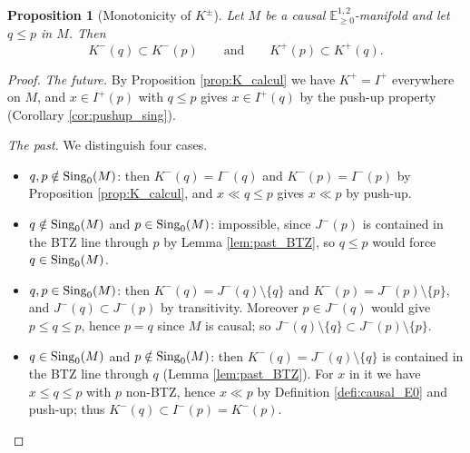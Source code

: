 \documentclass[a4paper,twoside]{article}
\newcommand{\mass}[1]{\mathbb{E}^{1,2}_{#1}}
\newtheorem{prop}[lem]{Proposition}
\begin{document}
\begin{prop}[Monotonicity of $K^\pm$]\label{prop:K_monotone}
Let $M$ be a causal $\mass{\geq0}$-manifold and let $q\leq p$ in $M$. Then
$$K^-(q)\subset K^-(p) \qquad\text{and}\qquad K^+(p)\subset K^+(q).$$
\end{prop}
\begin{proof}
\emph{The future.} By Proposition \ref{prop:K_calcul} we have $K^+=I^+$ everywhere on $M$, and
$x\in I^+(p)$ with $q\leq p$ gives $x\in I^+(q)$ by the push-up property (Corollary
\ref{cor:pushup_sing}).

\emph{The past.} We distinguish four cases.
\begin{itemize}
\item $q,p\notin \mathrm{Sing}_0(M)$: then $K^-(q)=I^-(q)$ and $K^-(p)=I^-(p)$ by Proposition
\ref{prop:K_calcul}, and $x\ll q\leq p$ gives $x\ll p$ by push-up.
\item $q\notin \mathrm{Sing}_0(M)$ and $p\in \mathrm{Sing}_0(M)$: impossible, since $J^-(p)$ is contained in the BTZ
line through $p$ by Lemma \ref{lem:past_BTZ}, so $q\leq p$ would force $q\in \mathrm{Sing}_0(M)$.
\item $q,p\in \mathrm{Sing}_0(M)$: then $K^-(q)=J^-(q)\setminus\{q\}$ and $K^-(p)=J^-(p)\setminus\{p\}$, and
$J^-(q)\subset J^-(p)$ by transitivity. Moreover $p\in J^-(q)$ would give $p\leq q\leq p$, hence
$p=q$ since $M$ is causal; so $J^-(q)\setminus\{q\}\subset J^-(p)\setminus\{p\}$.
\item $q\in \mathrm{Sing}_0(M)$ and $p\notin \mathrm{Sing}_0(M)$: then $K^-(q)=J^-(q)\setminus\{q\}$ is contained in
the BTZ line through $q$ (Lemma \ref{lem:past_BTZ}). For $x$ in it we have $x\leq q\leq p$ with $p$
non-BTZ, hence $x\ll p$ by Definition \ref{defi:causal_E0} and push-up; thus
$K^-(q)\subset I^-(p)=K^-(p)$.
\end{itemize}
\end{proof}
\end{document}
